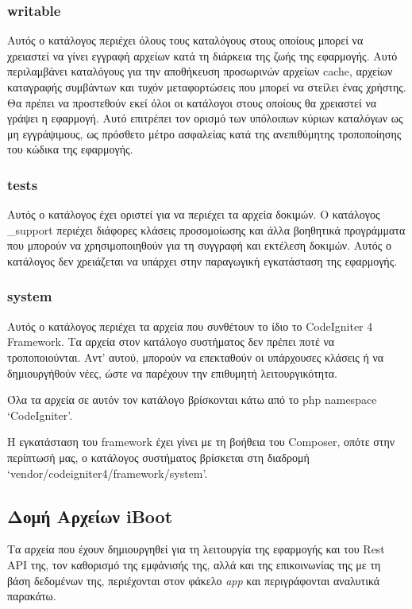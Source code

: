 \subsubsection{writable} \label{ui:writable}
Αυτός ο κατάλογος περιέχει όλους τους καταλόγους στους οποίους μπορεί να χρειαστεί να γίνει εγγραφή αρχείων κατά τη διάρκεια της ζωής της εφαρμογής. Αυτό περιλαμβάνει καταλόγους για την αποθήκευση προσωρινών αρχείων cache, αρχείων καταγραφής συμβάντων και τυχόν μεταφορτώσεις που μπορεί να στείλει ένας χρήστης. Θα πρέπει να προστεθούν εκεί όλοι οι κατάλογοι στους οποίους θα χρειαστεί να γράψει η εφαρμογή. Αυτό επιτρέπει τον ορισμό των υπόλοιπων κύριων καταλόγων ως μη εγγράψιμους, ως πρόσθετο μέτρο ασφαλείας κατά της ανεπιθύμητης τροποποίησης του κώδικα της εφαρμογής.

\subsubsection{tests} \label{ui:tests}
Αυτός ο κατάλογος έχει οριστεί για να περιέχει τα αρχεία δοκιμών. Ο κατάλογος \_support περιέχει διάφορες κλάσεις προσομοίωσης και άλλα βοηθητικά προγράμματα που μπορούν να χρησιμοποιηθούν για τη συγγραφή και εκτέλεση δοκιμών. Αυτός ο κατάλογος δεν χρειάζεται να υπάρχει στην παραγωγική εγκατάσταση της εφαρμογής.

\subsubsection{system} \label{ui:system}
Αυτός ο κατάλογος περιέχει τα αρχεία που συνθέτουν το ίδιο το CodeIgniter 4 Framework. Tα αρχεία στον κατάλογο συστήματος δεν πρέπει ποτέ να τροποποιούνται. Αντ' αυτού, μπορούν να επεκταθούν οι υπάρχουσες κλάσεις ή να δημιουργήθούν νέες, ώστε να παρέχουν την επιθυμητή λειτουργικότητα.

Όλα τα αρχεία σε αυτόν τον κατάλογο βρίσκονται κάτω από το php namespace `CodeIgniter'.

Η εγκατάσταση του framework έχει γίνει με τη βοήθεια του Composer, οπότε στην περίπτωσή μας, ο κατάλογος συστήματος βρίσκεται στη διαδρομή `vendor/codeigniter4/framework/system'.

\FloatBarrier
\subsection{Δομή Αρχείων iBoot}
Τα αρχεία που έχουν δημιουργηθεί για τη λειτουργία της εφαρμογής και του Rest API της, τον καθορισμό της εμφάνισής της, αλλά και της επικοινωνίας της με τη βάση δεδομένων της, περιέχονται στον φάκελο \emph{app} και περιγράφονται αναλυτικά παρακάτω.

